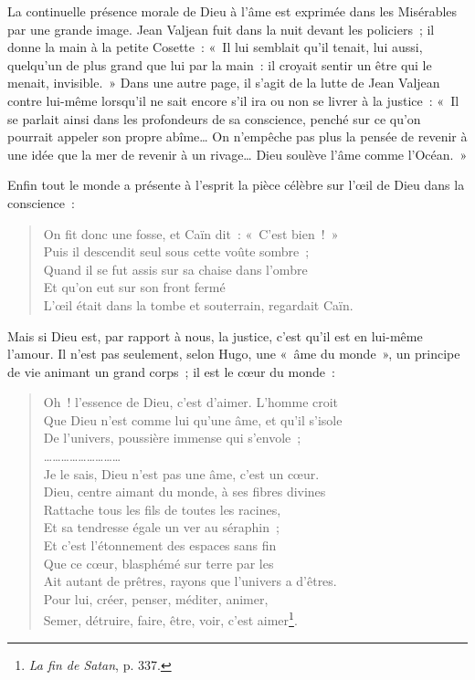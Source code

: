 \documentclass[french,twoside]{book} %
\begin{document}
\noindent La continuelle présence morale de Dieu à l’âme est exprimée dans les Misérables par une grande image. Jean Valjean fuit dans la nuit devant les policiers ; il donne la main à la petite Cosette : « Il lui semblait qu’il tenait, lui aussi, quelqu’un de plus grand que lui par la main : il croyait sentir un être qui le menait, invisible. » Dans une autre page, il s’agit de la lutte de Jean Valjean contre lui-même lorsqu’il ne sait encore s’il ira ou non se livrer à la justice : « Il se parlait ainsi dans les profondeurs de sa conscience, penché sur ce qu’on pourrait appeler son propre abîme… On n’empêche pas plus la pensée de revenir à une idée que la mer de revenir à un rivage… Dieu soulève l’âme comme l’Océan. »\par
Enfin tout le monde a présente à l’esprit la pièce célèbre sur l’œil de Dieu dans la conscience :\par


\begin{verse}
On fit donc une fosse, et Caïn dit : « C’est bien ! »\\
Puis il descendit seul sous cette voûte sombre ;\\
Quand il se fut assis sur sa chaise dans l’ombre\\
Et qu’on eut sur son front fermé\\
L’œil était dans la tombe et souterrain, regardait Caïn.\\
\end{verse}

\noindent Mais si Dieu est, par rapport à nous, la justice, c’est qu’il est en lui-même l’amour. Il n’est pas seulement, selon Hugo, une « âme du monde », un principe de vie animant un grand corps ; il est le cœur du monde :\par


\begin{verse}
Oh ! l’essence de Dieu, c’est d’aimer. L’homme croit\\
Que Dieu n’est comme lui qu’une âme, et qu’il s’isole\\
De l’univers, poussière immense qui s’envole ;\\
………………………\\
Je le sais, Dieu n’est pas une âme, c’est un cœur.\\
Dieu, centre aimant du monde, à ses fibres divines\\
Rattache tous les fils de toutes les racines,\\
Et sa tendresse égale un ver au séraphin ;\\
Et c’est l’étonnement des espaces sans fin\\
Que ce cœur, blasphémé sur terre par les\\
Ait autant de prêtres, rayons que l’univers a d’êtres.\\
Pour lui, créer, penser, méditer, animer,\\
Semer, détruire, faire, être, voir, c’est aimer\footnote{\emph{La fin de Satan}, p. 337.}.\\
\end{verse}
\end{document}
